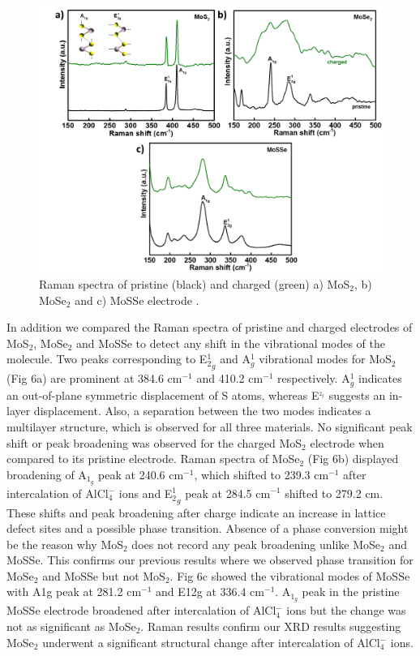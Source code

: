 \documentclass[num-refs]{wiley-article}
\begin{document}
\begin{figure}[h!]
\centering
\includegraphics[width=\textwidth]{figures/fig5}
\caption{Raman spectra of pristine (black) and charged (green) a) MoS$_2$, b) MoSe$_2$ and c) MoSSe electrode .}
\end{figure}


In addition we compared the Raman spectra of pristine and charged electrodes of MoS$_2$, MoSe$_2$ and MoSSe to detect any shift in the vibrational modes of the molecule. Two peaks corresponding to E$^1_2_g$ and A$^1_g$ vibrational modes for MoS$_2$ (Fig 6a) are prominent at 384.6 cm$^{-1}$ and 410.2 cm$^{-1}$ respectively. A$^1_g$ indicates an out-of-plane symmetric displacement of S atoms, whereas E$^_2_g$ suggests an in-layer displacement. Also, a separation between the two modes indicates a multilayer structure, which is observed for all three materials. No significant peak shift or peak broadening was observed for the charged MoS$_2$ electrode when compared to its pristine electrode. Raman spectra of MoSe$_2$ (Fig 6b) displayed broadening of A$_1_g$ peak at 240.6 cm$^{-1}$, which shifted to 239.3 cm$^{-1}$ after intercalation of AlCl$_4^-$ ions and E$^1_2_g$ peak at 284.5 cm$^{-1}$ shifted to 279.2 cm. These shifts and peak broadening after charge indicate an increase in lattice defect sites and a possible phase transition. Absence of a phase conversion might be the reason why MoS$_2$ does not record any peak broadening unlike MoSe$_2$ and MoSSe. This confirms our previous results where we observed phase transition for MoSe$_2$ and MoSSe but not MoS$_2$. Fig 6c showed the vibrational modes of MoSSe with A1g peak at 281.2 cm$^{-1}$ and E12g at 336.4 cm$^{-1}$. A$_1_g$ peak in the pristine MoSSe electrode broadened after intercalation of AlCl$_4^-$ ions but the change was not as significant as MoSe$_2$. Raman results confirm our XRD results suggesting MoSe$_2$ underwent a significant structural change after intercalation of AlCl$_4^-$ ions. 
\end{document}
